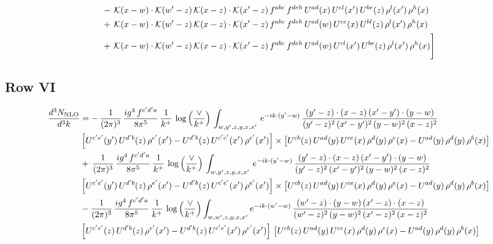 \documentclass[9pt]{article}
\numberwithin{equation}{section}
\begin{document}
\begin{align}
&-\,\mathcal{K}(x-w)\cdot\mathcal{K}(w'-z)\,\mathcal{K}(x-z)\cdot\mathcal{K}(x'-z)\,f^{abc}\,f^{deh}\,U^{ad}(x)\,U^{cl}(x')\,U^{be}(z)\,\rho^{l}(x')\,\rho^{h}(x)\notag \\ 
&+\,\mathcal{K}(x-w)\cdot\mathcal{K}(w'-z)\,\mathcal{K}(x-z)\cdot\mathcal{K}(x'-z)\,f^{abc}\,f^{deh}\,U^{ad}(w)\,U^{ce}(x)\,U^{bl}(z)\,\rho^{l}(x')\,\rho^{h}(x)\notag \\ 
&+\,\mathcal{K}(x-w)\cdot\mathcal{K}(w'-z)\,\mathcal{K}(x-z)\cdot\mathcal{K}(x'-z)\,f^{abc}\,f^{deh}\,U^{ad}(w)\,U^{cl}(x')\,U^{be}(z)\,\rho^{l}(x')\,\rho^{h}(x)\Bigg]
\end{align}
\subsection{Row VI}
\begin{align}
    \frac{d^{3}N_{\rm NLO}}{d^{3}k} & =    -\,\frac{1}{(2\pi)^{3}}\, \frac{ig^{4}\,f^{c'd'a}}{8\pi^{5}}\, \frac{1}{k^{+}}\,\log{\left(\frac{\vee}{k^{+}}\right)}\, \int_{w,y',z,y,x,x'}\, e^{-ik\cdot (y'-w)}\,\frac{(y'-z)\cdot (x-z)\,(x'-y')\cdot (y-w)}{(y'-z)^{2}\,(x'-y')^{2}\,(y-w)^{2}\,(x-z)^{2}}\notag \\ & \left[U^{c'e'}(y')\,U^{d'b}(z)\,\rho^{e'}(x')-U^{d'b}(z)\,U^{c'e'}(x')\,\rho^{e'}(x')\right]\times  \left[U^{cb}(z)\,U^{ad}(y)\,U^{ce}(x)\,\rho^{d}(y)\,\rho^{e}(x)-U^{ad}(y)\,\rho^{d}(y)\,\rho^{b}(x)\right] \notag \\
&   +\,\frac{1}{(2\pi)^{3}}\, \frac{ig^{4}\,f^{c'd'a}}{8\pi^{5}}\, \frac{1}{k^{+}}\,\log{\left(\frac{\vee}{k^{+}}\right)}\, \int_{w,y',z,y,x,x'}\, e^{-ik\cdot (y'-w)}\,\frac{(y'-z)\cdot (x-z)\,(x'-y')\cdot (y-w)}{(y'-z)^{2}\,(x'-y')^{2}\,(y-w)^{2}\,(x-z)^{2}}\notag \\ &   \left[U^{c'e'}(y')\,U^{d'b}(z)\,\rho^{e'}(x')-U^{d'b}(z)\,U^{c'e'}(x')\,\rho^{e'}(x')\right]\times  \left[U^{cb}(z)\,U^{ad}(y)\,U^{ce}(x)\,\rho^{d}(y)\,\rho^{e}(x)-U^{ad}(y)\,\rho^{d}(y)\,\rho^{b}(x)\right] \notag \\
&   -\frac{1}{(2\pi)^{3}}\, \frac{ig^{4}\,f^{c'd'a}}{8\pi^{5}}\, \frac{1}{k^{+}}\,\log{\left(\frac{\vee}{k^{+}}\right)}\int_{w,w',z,y,x,x'} e^{-ik\cdot (w'-w)}\,\frac{(w'-z)\cdot (y-w)\,(x'-z)\cdot (x-z)}{(w'-z)^{2}\,(y-w)^{2}\,(x'-z)^{2}\,(x-z)^{2}}\notag \\
&   \left[U^{c'e'}(z)\,U^{d'b}(z)\,\rho^{e'}(x')-U^{d'b}(z)\,U^{c'e'}(x')\,\rho^{e'}(x')\right]\,\left[U^{cb}(z)\,U^{ad}(y)\,U^{ce}(x)\,\rho^{d}(y)\,\rho^{e}(x)-U^{ad}(y)\,\rho^{d}(y)\,\rho^{b}(x)\right]
\end{align}
\end{document}
